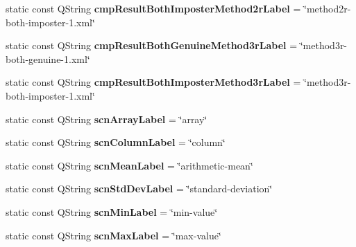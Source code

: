 \begin{DoxyCompactItemize}
\item 
\hypertarget{class_common_a437aeadc4c88f363bd6b2f1931d71e3a}{static const Q\+String {\bfseries cmp\+Result\+Both\+Imposter\+Method2r\+Label} = \char`\"{}method2r-\/both-\/imposter-\/1.xml\char`\"{}}\label{class_common_a437aeadc4c88f363bd6b2f1931d71e3a}

\item 
\hypertarget{class_common_a488f07c56ae2c29c813e193d480e8a8d}{static const Q\+String {\bfseries cmp\+Result\+Both\+Genuine\+Method3r\+Label} = \char`\"{}method3r-\/both-\/genuine-\/1.xml\char`\"{}}\label{class_common_a488f07c56ae2c29c813e193d480e8a8d}

\item 
\hypertarget{class_common_ad50febb9b7d66f8cfbcb7200f0f77722}{static const Q\+String {\bfseries cmp\+Result\+Both\+Imposter\+Method3r\+Label} = \char`\"{}method3r-\/both-\/imposter-\/1.xml\char`\"{}}\label{class_common_ad50febb9b7d66f8cfbcb7200f0f77722}

\item 
\hypertarget{class_common_a555dd981c82ac687566fde47a049ffca}{static const Q\+String {\bfseries scn\+Array\+Label} = \char`\"{}array\char`\"{}}\label{class_common_a555dd981c82ac687566fde47a049ffca}

\item 
\hypertarget{class_common_aee5d4bf35da4f1f37c619fda2fff572f}{static const Q\+String {\bfseries scn\+Column\+Label} = \char`\"{}column\char`\"{}}\label{class_common_aee5d4bf35da4f1f37c619fda2fff572f}

\item 
\hypertarget{class_common_a6b425ab74fcdac165c93bdb13df0f908}{static const Q\+String {\bfseries scn\+Mean\+Label} = \char`\"{}arithmetic-\/mean\char`\"{}}\label{class_common_a6b425ab74fcdac165c93bdb13df0f908}

\item 
\hypertarget{class_common_a94b63c940a115d145060cc43510b22aa}{static const Q\+String {\bfseries scn\+Std\+Dev\+Label} = \char`\"{}standard-\/deviation\char`\"{}}\label{class_common_a94b63c940a115d145060cc43510b22aa}

\item 
\hypertarget{class_common_a6fd604b4cec3bdd208fc6ab04c7ab71d}{static const Q\+String {\bfseries scn\+Min\+Label} = \char`\"{}min-\/value\char`\"{}}\label{class_common_a6fd604b4cec3bdd208fc6ab04c7ab71d}

\item 
\hypertarget{class_common_a745ed089afe7aa8aec9f0c57d6212b29}{static const Q\+String {\bfseries scn\+Max\+Label} = \char`\"{}max-\/value\char`\"{}}\label{class_common_a745ed089afe7aa8aec9f0c57d6212b29}


\end{DoxyCompactItemize}
